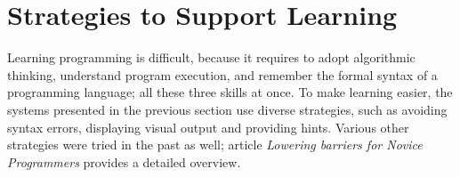 %




\section{Strategies to Support Learning}
\label{sec:strategies-for-easier-learning}

Learning programming is difficult,
  because it requires
  to adopt algorithmic thinking,
  understand program execution,
  and remember the formal syntax of a programming language;
  all these three skills at once. %
To make learning easier,
  the systems presented in the previous section use diverse strategies,
  such as avoiding syntax errors,
  displaying visual output
  and providing hints.
Various other strategies were tried in the past as well;
article \emph{Lowering barriers for Novice Programmers}
  \cite{lowering-barriers}
  provides a detailed overview.


